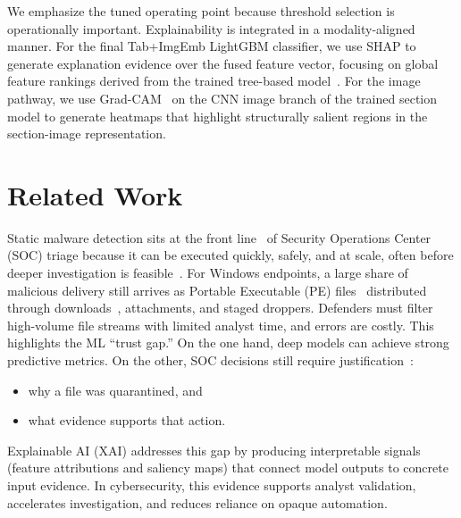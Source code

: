 \documentclass[conference]{IEEEtran}
\begin{document}


We emphasize the tuned operating point because threshold selection is operationally important.
Explainability is integrated in a modality-aligned manner.
For the final Tab+ImgEmb LightGBM classifier, we use SHAP to generate explanation evidence over the fused feature vector, focusing on global feature rankings derived from the trained tree-based model~\cite{LL2017}.
For the image pathway, we use Grad-CAM~\cite{SCDVPB2017} on the CNN image branch of the trained section model to generate heatmaps that highlight structurally salient regions in the section-image representation.
%



\section{Related Work}
\label{section:literature-review}

Static malware detection sits at the front line~\cite{KBSSSK2025} of Security Operations Center (SOC) triage because it can be executed quickly, safely, and at scale, often before deeper investigation is feasible~\cite{GPH2024}.
For Windows endpoints, a large share of malicious delivery still arrives as Portable Executable (PE) files~\cite{opentext2025} distributed through downloads~\cite{recordedfuture2025malware}, attachments, and staged droppers.
Defenders must filter high-volume file streams with limited analyst time, and errors are costly.
This highlights the ML ``trust gap.''
On the one hand, deep models can achieve strong predictive metrics.
On the other, SOC decisions still require justification~\cite{NSDSP2025}: 
\begin{itemize}
 \item 
 why a file was quarantined, and 
 \item 
 what evidence supports that action.
\end{itemize}



Explainable AI (XAI) addresses this gap by producing interpretable signals (feature attributions and saliency maps) that connect model outputs to concrete input evidence.
In cybersecurity, this evidence supports analyst validation, accelerates investigation, and reduces reliance on opaque automation.
\end{document}
